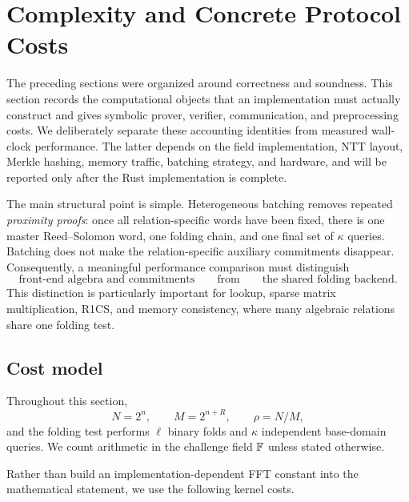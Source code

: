 \section{Complexity and Concrete Protocol Costs}
\label{sec:complexity}

The preceding sections were organized around correctness and soundness.  This section records the computational objects that an implementation must actually construct and gives symbolic prover, verifier, communication, and preprocessing costs.  We deliberately separate these accounting identities from measured wall-clock performance.  The latter depends on the field implementation, NTT layout, Merkle hashing, memory traffic, batching strategy, and hardware, and will be reported only after the Rust implementation is complete.

The main structural point is simple.  Heterogeneous batching removes repeated \emph{proximity proofs}: once all relation-specific words have been fixed, there is one master Reed--Solomon word, one folding chain, and one final set of $\kappa$ queries.  Batching does not make the relation-specific auxiliary commitments disappear.  Consequently, a meaningful performance comparison must distinguish
\begin{equation}
  \text{front-end algebra and commitments}
  \qquad\text{from}\qquad
  \text{the shared folding backend}.
  \label{eq:complexity-two-layers}
\end{equation}
This distinction is particularly important for lookup, sparse matrix multiplication, R1CS, and memory consistency, where many algebraic relations share one folding test.

\subsection{Cost model}
\label{sec:complexity-cost-model}

Throughout this section,
\[
  N=2^n,
  \qquad
  M=2^{n+R},
  \qquad
  \rho=N/M,
\]
and the folding test performs $\ell$ binary folds and $\kappa$ independent base-domain queries.  We count arithmetic in the challenge field $\mathbb{F}$ unless stated otherwise.

Rather than build an implementation-dependent FFT constant into the mathematical statement, we use the following kernel costs.

